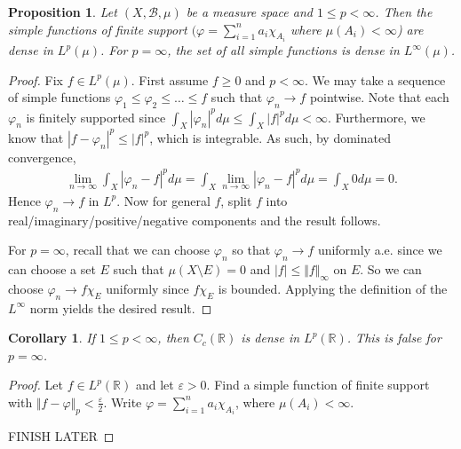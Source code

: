\documentclass[11pt]{amsart}
\newtheorem{proposition}[theorem]{Proposition}
\newtheorem{corollary}[theorem]{Corollary}
\theoremstyle{definition}
\numberwithin{equation}{section}
\begin{document}
\begin{proposition}
    Let $(X,\mathcal B,\mu)$ be a measure space and $1\le p< \infty$. Then the simple functions of finite support $(\varphi=\sum_{i=1}^na_i\chi_{A_i}$ where $\mu(A_i)<\infty$) are dense in $L^p(\mu)$. For $p=\infty$, the set of all simple functions is dense in $L^\infty(\mu)$.
\end{proposition}
\begin{proof}
    Fix $f\in L^p(\mu)$. First assume $f\ge 0$ and $p<\infty$. We may take a sequence of simple functions $\varphi_1\le\varphi_2\le\ldots\le f$ such that $\varphi_n\to f$ pointwise. Note that each $\varphi_n$ is finitely supported since $\int_X|\varphi_n|^pd\mu\le \int_X|f|^pd\mu<\infty$. Furthermore, we know that $|f-\varphi_n|^p\le |f|^p$, which is integrable. As such, by dominated convergence,
    \begin{align*}
        \lim_{n\to\infty}\int_X|\varphi_n-f|^pd\mu=\int_X\lim_{n\to\infty}|\varphi_n-f|^pd\mu=\int_X0d\mu=0.
    \end{align*}
    Hence $\varphi_n\to f$ in $L^p$. Now for general $f$, split $f$ into real/imaginary/positive/negative components and the result follows.

    For $p=\infty$, recall that we can choose $\varphi_n$ so that $\varphi_n\to f$ uniformly a.e. since we can choose a set $E$ such that $\mu(X\setminus E)=0$ and $|f|\le \Vert f\Vert_\infty$ on $E$. So we can choose $\varphi_n\to f\chi_E$ uniformly since $f\chi_E$ is bounded. Applying the definition of the $L^\infty$ norm yields the desired result.
\end{proof}
\begin{corollary}
    If $1\le p<\infty$, then $C_c(\mathbb R)$ is dense in $L^p(\mathbb R)$. This is false for $p=\infty$.
\end{corollary}
\begin{proof}
    Let $f\in L^p(\mathbb R)$ and let $\varepsilon>0$. Find a simple function of finite support with $\Vert f-\varphi\Vert_p<\frac{\varepsilon}{2}$. Write $\varphi=\sum_{i=1}^na_i\chi_{A_i}$, where $\mu(A_i)<\infty$.

    FINISH LATER
\end{proof}
\end{document}
